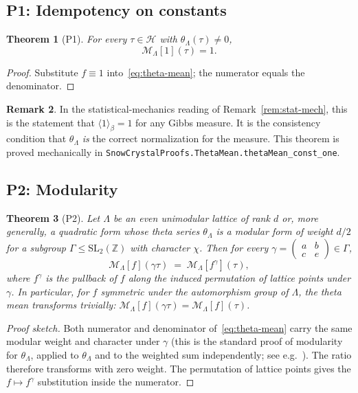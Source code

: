 \documentclass[11pt,letterpaper]{article}
\theoremstyle{plain}
\newtheorem{theorem}{Theorem}[section]
\theoremstyle{definition}
\newtheorem{remark}[theorem]{Remark}
\newcommand{\Z}{\mathbb{Z}}
\newcommand{\Lat}{\Lambda}
\newcommand{\tmean}[1]{\mathcal{M}_{\Lat}[#1]}
\begin{document}
\subsection{P1: Idempotency on constants}

\begin{theorem}[P1]\label{thm:P1}
For every $\tau\in\mathcal{H}$ with $\theta_\Lat(\tau)\ne 0$,
\begin{equation}\label{eq:P1}
  \tmean{1}(\tau) = 1.
\end{equation}
\end{theorem}
\begin{proof}
Substitute $f\equiv 1$ into~\eqref{eq:theta-mean}; the numerator
equals the denominator.
\end{proof}

\begin{remark}
In the statistical-mechanics reading of Remark~\ref{rem:stat-mech},
this is the statement that $\langle 1\rangle_\beta = 1$ for any
Gibbs measure.  It is the consistency condition that $\theta_\Lat$
\emph{is} the correct normalization for the measure.  This theorem
is proved mechanically in
\texttt{SnowCrystalProofs.ThetaMean.thetaMean\_const\_one}.
\end{remark}

\subsection{P2: Modularity}

\begin{theorem}[P2]\label{thm:P2}
Let $\Lat$ be an even unimodular lattice of rank $d$ or, more
generally, a quadratic form whose theta series $\theta_\Lat$ is a
modular form of weight $d/2$ for a subgroup $\Gamma\le
\mathrm{SL}_2(\Z)$ with character $\chi$.  Then for every
$\gamma = \begin{pmatrix}a&b\\c&e\end{pmatrix}\in\Gamma$,
\begin{equation}\label{eq:P2}
  \tmean{f}(\gamma\tau) \;=\; \tmean{f^\gamma}(\tau),
\end{equation}
where $f^\gamma$ is the pullback of $f$ along the induced
permutation of lattice points under $\gamma$.  In particular, for
$f$ symmetric under the automorphism group of $\Lat$, the theta
mean transforms trivially: $\tmean{f}(\gamma\tau)=\tmean{f}(\tau)$.
\end{theorem}
\begin{proof}[Proof sketch]
Both numerator and denominator of~\eqref{eq:theta-mean} carry the
same modular weight and character under $\gamma$ (this is the
standard proof of modularity for $\theta_\Lat$, applied to
$\theta_\Lat$ and to the weighted sum independently; see e.g.\
\cite[\S7]{BumpAutomorphic}).  The ratio therefore transforms with
zero weight.  The permutation of lattice points gives the
$f\mapsto f^\gamma$ substitution inside the numerator.
\end{proof}
\end{document}

